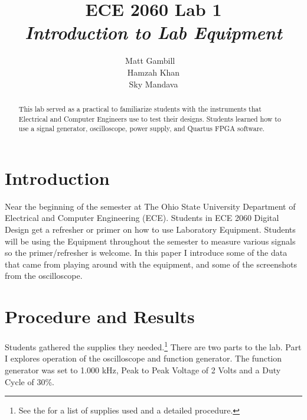 \documentclass[journal,onecolumn]{IEEEtran}
\title{ECE 2060 Lab 1\\ 
\Large \textit{Introduction to Lab Equipment}}
\author{Matt Gambill ~\IEEEmembership{Member, OSU IEEE} \\
		Hamzah Khan\\
		Sky Mandava}
\begin{document}
\maketitle

\begin{abstract}
This lab served as a practical to familiarize students with the instruments that Electrical and Computer Engineers use to test their designs. Students learned how to use a signal generator, oscilloscope, power supply, and Quartus FPGA software.
\end{abstract}

\section*{Introduction}
Near the beginning of the semester at The Ohio State University Department of Electrical and Computer Engineering (ECE). Students in ECE 2060 Digital Design get a refresher or primer on how to use Laboratory Equipment. Students will be using the Equipment throughout the semester to measure various signals so the primer/refresher is welcome. In this paper I introduce some of the data that came from playing around with the equipment, and some of the screenshots from the oscilloscope.
\section*{Procedure and Results}
Students gathered the supplies they needed.\footnote{ See \cite{readMe} the for a list of supplies used and a detailed procedure.} 
There are two parts to the lab. Part I explores operation of the oscilloscope and function generator. The function generator was set to 1.000 kHz, Peak to Peak Voltage of 2 Volts and a Duty Cycle of 30\%.
 
\end{document}
